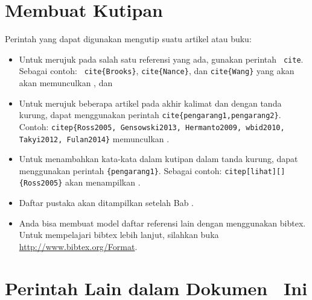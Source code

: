 \section{Membuat Kutipan}
Perintah yang dapat digunakan mengutip suatu artikel atau buku: 
\begin{itemize}
	\item  Untuk merujuk pada salah satu referensi yang ada, gunakan perintah \texttt{ \bslash cite}. Sebagai contoh: \texttt{ \bslash cite\{Brooks\}}, \texttt{\bslash cite\{Nance\}}, dan \texttt{\bslash cite\{Wang\}}
	yang akan akan memunculkan  \cite{Brooks}, \cite{Nance} dan \cite{Wang}  
	\item Untuk merujuk beberapa artikel pada akhir kalimat dan dengan tanda kurung, dapat menggunakan perintah \texttt{\bslash cite\{pengarang1,pengarang2\}}. Contoh: \texttt{\bslash citep\{Ross2005, Gensowski2013, Hermanto2009, wbid2010, Takyi2012, Fulan2014\}} memunculkan
	\citep{Ross2005, Gensowski2013, Hermanto2009, wbid2010, Takyi2012, Fulan2014}.
	\item Untuk menambahkan kata-kata dalam kutipan dalam tanda kurung, dapat menggunakan perintah \texttt{\bslash [kata] [kata] \{pengarang1\}}. Sebagai contoh:
	\texttt{\bslash citep[lihat][]\{Ross2005\}} akan menampilkan \citep[lihat][]{Ross2005}.
 	\item Daftar pustaka akan ditampilkan setelah Bab \babLima.
 	\item Anda bisa membuat model daftar referensi lain dengan menggunakan bibtex.
Untuk mempelajari bibtex lebih lanjut, silahkan buka 
\url{http://www.bibtex.org/Format}. 

\end{itemize}



\section{Perintah Lain dalam Dokumen \latex~Ini}
